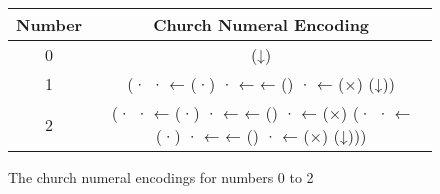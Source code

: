 \begin{figure}[htb]
    \begin{center}
    \begin{tabular}{ |c|c| } 
    \hline
    Number & Church Numeral Encoding \\ 
    \hline
    0 & (↓) \\
    \hline
    1 & (· · ← (·) · ← ← () · ← (×) (↓))  \\
    \hline
    2 & (· · ← (·) · ← ← () · ← (×) (· · ← (·) · ← ← () · ← (×) (↓))) \\
    \hline
    \end{tabular}
    \end{center}
    \caption{The church numeral encodings for numbers 0 to 2}
    \label{fig:kihi_church_numeral_encoding}
\end{figure}
